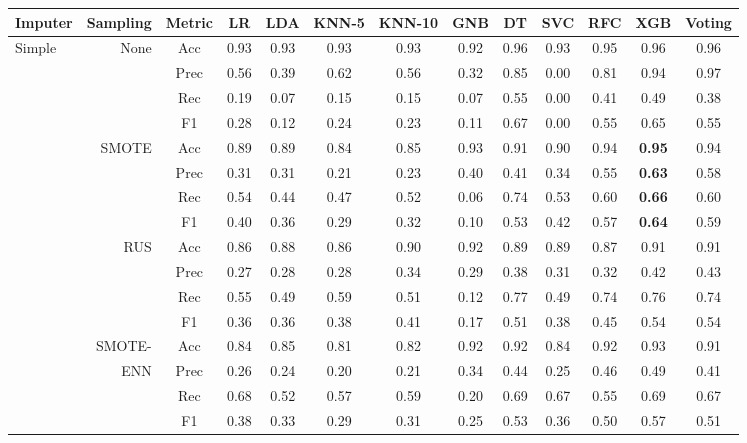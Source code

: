 \begin{table*}
\ContinuedFloat
\begin{narrow}{-1cm}{-1cm}
\begin{subtable}[t]{2\columnwidth}
    \centering
    \begin{tabular}{l|r|c|cccccccccc}
       Imputer & Sampling & Metric & LR & LDA & KNN-5 & KNN-10 & GNB & DT & SVC & RFC & XGB & Voting \\
        \hline \hline
        Simple & None & Acc & 0.93 & 0.93 & 0.93 & 0.93 & 0.92 & 0.96 & 0.93 & 0.95 & 0.96 & 0.96 \\
        ~ & ~ & Prec & 0.56 & 0.39 & 0.62 & 0.56 & 0.32 & 0.85 & 0.00 & 0.81 & 0.94 & 0.97 \\
        ~ & ~ & Rec & 0.19 & 0.07 & 0.15 & 0.15 & 0.07 & 0.55 & 0.00 & 0.41 & 0.49 & 0.38 \\
        ~ & ~ & F1 & 0.28 & 0.12 & 0.24 & 0.23 & 0.11 & 0.67 & 0.00 & 0.55 & 0.65 & 0.55 \\
        \cline{2-13}
        ~ & SMOTE & Acc & 0.89 & 0.89 & 0.84 & 0.85 & 0.93 & 0.91 & 0.90 & 0.94 & \textbf{0.95} & 0.94 \\
        ~ & ~ & Prec & 0.31 & 0.31 & 0.21 & 0.23 & 0.40 & 0.41 & 0.34 & 0.55 & \textbf{0.63} & 0.58 \\
        ~ & ~ & Rec & 0.54 & 0.44 & 0.47 & 0.52 & 0.06 & 0.74 & 0.53 & 0.60 & \textbf{0.66} & 0.60 \\
        ~ & ~ & F1 & 0.40 & 0.36 & 0.29 & 0.32 & 0.10 & 0.53 & 0.42 & 0.57 & \textbf{0.64} & 0.59 \\
        \cline{2-13}
        ~ & RUS & Acc & 0.86 & 0.88 & 0.86 & 0.90 & 0.92 & 0.89 & 0.89 & 0.87 & 0.91 & 0.91 \\
        ~ & ~ & Prec & 0.27 & 0.28 & 0.28 & 0.34 & 0.29 & 0.38 & 0.31 & 0.32 & 0.42 & 0.43 \\
        ~ & ~ & Rec & 0.55 & 0.49 & 0.59 & 0.51 & 0.12 & 0.77 & 0.49 & 0.74 & 0.76 & 0.74 \\
        ~ & ~ & F1 & 0.36 & 0.36 & 0.38 & 0.41 & 0.17 & 0.51 & 0.38 & 0.45 & 0.54 & 0.54 \\
        \cline{2-13}
        ~ & SMOTE- & Acc & 0.84 & 0.85 & 0.81 & 0.82 & 0.92 & 0.92 & 0.84 & 0.92 & 0.93 & 0.91 \\
        ~ & ENN & Prec & 0.26 & 0.24 & 0.20 & 0.21 & 0.34 & 0.44 & 0.25 & 0.46 & 0.49 & 0.41 \\
        ~ & ~ & Rec & 0.68 & 0.52 & 0.57 & 0.59 & 0.20 & 0.69 & 0.67 & 0.55 & 0.69 & 0.67 \\
        ~ & ~ & F1 & 0.38 & 0.33 & 0.29 & 0.31 & 0.25 & 0.53 & 0.36 & 0.50 & 0.57 & 0.51 \\
        \hline\hline
        

\end{tabular}
\end{subtable}
\end{narrow}
\end{table*}

